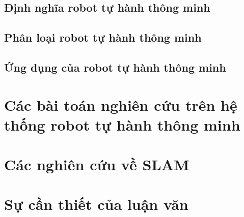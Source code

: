 \subsection{Định nghĩa robot tự hành thông minh}



\subsection{Phân loại robot tự hành thông minh}



\subsection{Ứng dụng của robot tự hành thông minh}

\section{Các bài toán nghiên cứu trên hệ thống robot tự hành thông minh}

\section{Các nghiên cứu về SLAM}

\section{Sự cần thiết của luận văn}


